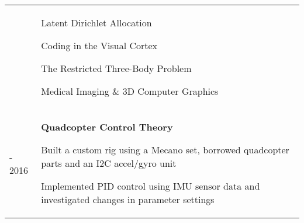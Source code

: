 \documentclass[letterpaper, 10pt]{article}
\begin{document}
\begin{tabularx}{\linewidth}{>{\raggedleft}p{2.2cm}|X X}
\begin{compact}
	\vspace{-.5\baselineskip}
\end{compact}&
\begin{compact}
	\vspace{-.5\baselineskip}
    \item Latent Dirichlet Allocation
    \item Coding in the Visual Cortex
    \item The Restricted Three-Body Problem
    \item Medical Imaging \& 3D Computer Graphics
	\vspace{-.5\baselineskip}
\end{compact}\\
2015 - 2016 & \multicolumn{2}{p{\linegoal}}{
	\vspace{-2.9mm}\textbf{Quadcopter Control Theory}
	\begin{compact}
	\item Built a custom rig using a Mecano set, borrowed quadcopter parts and an I2C accel/gyro unit
	\item Implemented PID control using IMU sensor data and investigated changes in parameter settings
	\vspace{-\baselineskip}
	\end{compact}
}\\
\end{tabularx}

\vspace{-0.5\baselineskip}
\end{document}
